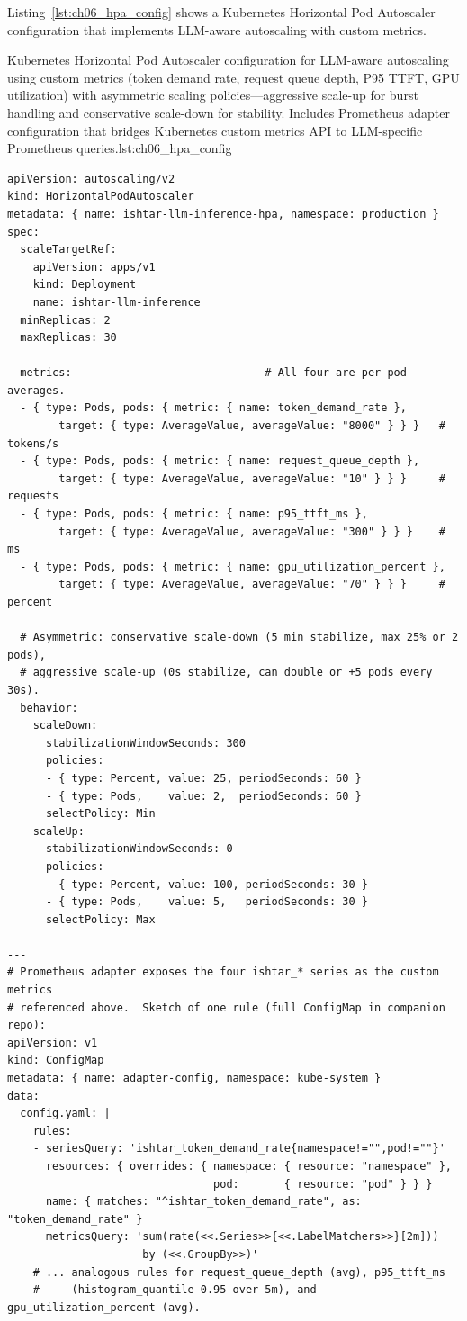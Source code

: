 Listing~\ref{lst:ch06_hpa_config} shows a Kubernetes Horizontal Pod Autoscaler configuration that implements LLM-aware autoscaling with custom metrics.

\begin{codebox}{Kubernetes Horizontal Pod Autoscaler configuration for LLM-aware autoscaling using custom metrics (token demand rate, request queue depth, P95 TTFT, GPU utilization) with asymmetric scaling policies---aggressive scale-up for burst handling and conservative scale-down for stability. Includes Prometheus adapter configuration that bridges Kubernetes custom metrics API to LLM-specific Prometheus queries.}{lst:ch06_hpa_config}
\begin{verbatim}
apiVersion: autoscaling/v2
kind: HorizontalPodAutoscaler
metadata: { name: ishtar-llm-inference-hpa, namespace: production }
spec:
  scaleTargetRef:
    apiVersion: apps/v1
    kind: Deployment
    name: ishtar-llm-inference
  minReplicas: 2
  maxReplicas: 30

  metrics:                              # All four are per-pod averages.
  - { type: Pods, pods: { metric: { name: token_demand_rate },
        target: { type: AverageValue, averageValue: "8000" } } }   # tokens/s
  - { type: Pods, pods: { metric: { name: request_queue_depth },
        target: { type: AverageValue, averageValue: "10" } } }     # requests
  - { type: Pods, pods: { metric: { name: p95_ttft_ms },
        target: { type: AverageValue, averageValue: "300" } } }    # ms
  - { type: Pods, pods: { metric: { name: gpu_utilization_percent },
        target: { type: AverageValue, averageValue: "70" } } }     # percent

  # Asymmetric: conservative scale-down (5 min stabilize, max 25% or 2 pods),
  # aggressive scale-up (0s stabilize, can double or +5 pods every 30s).
  behavior:
    scaleDown:
      stabilizationWindowSeconds: 300
      policies:
      - { type: Percent, value: 25, periodSeconds: 60 }
      - { type: Pods,    value: 2,  periodSeconds: 60 }
      selectPolicy: Min
    scaleUp:
      stabilizationWindowSeconds: 0
      policies:
      - { type: Percent, value: 100, periodSeconds: 30 }
      - { type: Pods,    value: 5,   periodSeconds: 30 }
      selectPolicy: Max

---
# Prometheus adapter exposes the four ishtar_* series as the custom metrics
# referenced above.  Sketch of one rule (full ConfigMap in companion repo):
apiVersion: v1
kind: ConfigMap
metadata: { name: adapter-config, namespace: kube-system }
data:
  config.yaml: |
    rules:
    - seriesQuery: 'ishtar_token_demand_rate{namespace!="",pod!=""}'
      resources: { overrides: { namespace: { resource: "namespace" },
                                pod:       { resource: "pod" } } }
      name: { matches: "^ishtar_token_demand_rate", as: "token_demand_rate" }
      metricsQuery: 'sum(rate(<<.Series>>{<<.LabelMatchers>>}[2m]))
                     by (<<.GroupBy>>)'
    # ... analogous rules for request_queue_depth (avg), p95_ttft_ms
    #     (histogram_quantile 0.95 over 5m), and gpu_utilization_percent (avg).
\end{verbatim}
\end{codebox}

